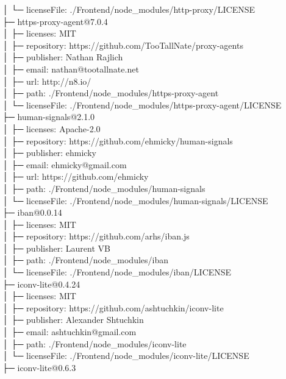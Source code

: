 \documentclass[
    paper=a4,
    twoside=false,
    parskip=half,
    listof=entryprefix,
    listof=totoc,
    index=totoc,
    bibliography=totoc,
    headsepline,
]{scrbook}
\begin{document}
    │  └─ licenseFile: ./Frontend/node\_modules/http-proxy/LICENSE\\
    ├─ https-proxy-agent@7.0.4\\
    │  ├─ licenses: MIT\\
    │  ├─ repository: https://github.com/TooTallNate/proxy-agents\\
    │  ├─ publisher: Nathan Rajlich\\
    │  ├─ email: nathan@tootallnate.net\\
    │  ├─ url: http://n8.io/\\
    │  ├─ path: ./Frontend/node\_modules/https-proxy-agent\\
    │  └─ licenseFile: ./Frontend/node\_modules/https-proxy-agent/LICENSE\\
    ├─ human-signals@2.1.0\\
    │  ├─ licenses: Apache-2.0\\
    │  ├─ repository: https://github.com/ehmicky/human-signals\\
    │  ├─ publisher: ehmicky\\
    │  ├─ email: ehmicky@gmail.com\\
    │  ├─ url: https://github.com/ehmicky\\
    │  ├─ path: ./Frontend/node\_modules/human-signals\\
    │  └─ licenseFile: ./Frontend/node\_modules/human-signals/LICENSE\\
    ├─ iban@0.0.14\\
    │  ├─ licenses: MIT\\
    │  ├─ repository: https://github.com/arhs/iban.js\\
    │  ├─ publisher: Laurent VB\\
    │  ├─ path: ./Frontend/node\_modules/iban\\
    │  └─ licenseFile: ./Frontend/node\_modules/iban/LICENSE\\
    ├─ iconv-lite@0.4.24\\
    │  ├─ licenses: MIT\\
    │  ├─ repository: https://github.com/ashtuchkin/iconv-lite\\
    │  ├─ publisher: Alexander Shtuchkin\\
    │  ├─ email: ashtuchkin@gmail.com\\
    │  ├─ path: ./Frontend/node\_modules/iconv-lite\\
    │  └─ licenseFile: ./Frontend/node\_modules/iconv-lite/LICENSE\\
    ├─ iconv-lite@0.6.3\\
\end{document}
